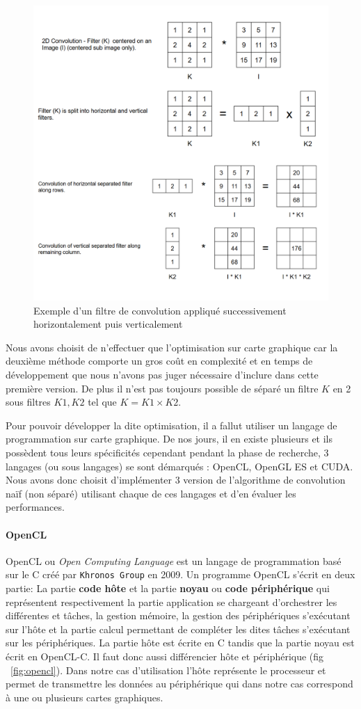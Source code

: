 \begin{figure}[H]
\centering
\includegraphics[width=0.7\linewidth]{images/separableconv}
\caption{Exemple d'un filtre de convolution appliqué successivement horizontalement puis verticalement}
\label{fig:conv:separable}
\end{figure}

Nous avons choisit de n'effectuer que l'optimisation sur carte graphique car la deuxième méthode comporte un gros coût en complexité et en temps de développement que nous n'avons pas juger nécessaire d'inclure dans cette première version. De plus il n'est pas toujours possible de séparé un filtre $K$ en 2 sous filtres $K1, K2$ tel que $K = K1 \times K2$.

Pour pouvoir développer la dite optimisation, il a fallut utiliser un langage de programmation sur carte graphique. De nos jours, il en existe plusieurs et ils possèdent tous leurs spécificités cependant pendant la phase de recherche, 3 langages (ou sous langages) se sont démarqués : OpenCL\cite{opencl}, OpenGL ES\cite{opengles} et CUDA\cite{cuda}. Nous avons donc choisit d'implémenter 3 version de l'algorithme de convolution naïf (non séparé) utilisant chaque de ces langages et d'en évaluer les performances.

\paragraph{OpenCL} OpenCL ou \emph{Open Computing Language} est un langage de programmation basé sur le C créé par \texttt{Khronos Group} en 2009.
Un programme OpenCL s'écrit en deux partie:
La partie \textbf{code hôte} et la partie \textbf{noyau} ou \textbf{code périphérique} qui représentent respectivement la partie application se chargeant d'orchestrer les différentes et tâches, la gestion mémoire, la gestion des périphériques s'exécutant sur l'hôte et la partie calcul permettant de compléter les dites tâches s'exécutant sur les périphériques. La partie hôte est écrite en C tandis que la partie noyau est écrit en OpenCL-C.
Il faut donc aussi différencier hôte et périphérique (fig ~\ref{fig:opencl}). Dans notre cas d'utilisation l'hôte représente le processeur et permet de transmettre les données au périphérique qui dans notre cas correspond à une ou plusieurs cartes graphiques.


